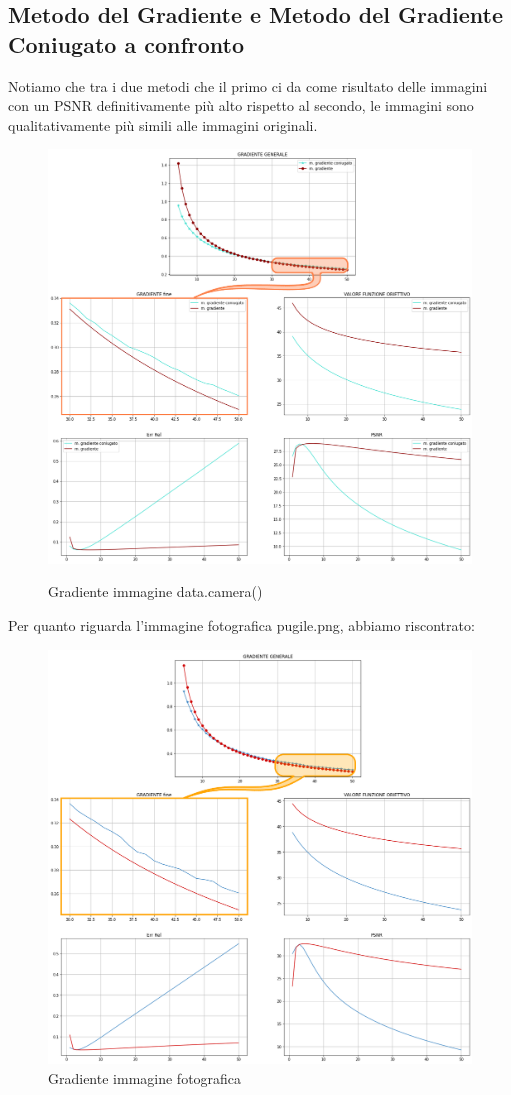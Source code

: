 \subsection{Metodo del Gradiente e Metodo del Gradiente Coniugato a confronto}

Notiamo che tra i due metodi che il primo ci da come risultato delle immagini con un PSNR 
definitivamente più alto rispetto al secondo, le immagini sono qualitativamente più simili 
alle immagini originali. 

\begin{figure}[H]
    \centering
    \includegraphics[width=\textwidth]{output/MGCvsMG-enph.png}
    \label{fig:MGCvsMG}
    \caption{Gradiente immagine data.camera()}
\end{figure}

Per quanto riguarda l'immagine fotografica pugile.png, abbiamo riscontrato: 

\begin{figure}[H]
    \centering
    \includegraphics[width=\textwidth]{output/MGCvsMG-pugile-enph.png}
    \caption{Gradiente immagine fotografica}
    \label{fig:errorOutput}
\end{figure}


